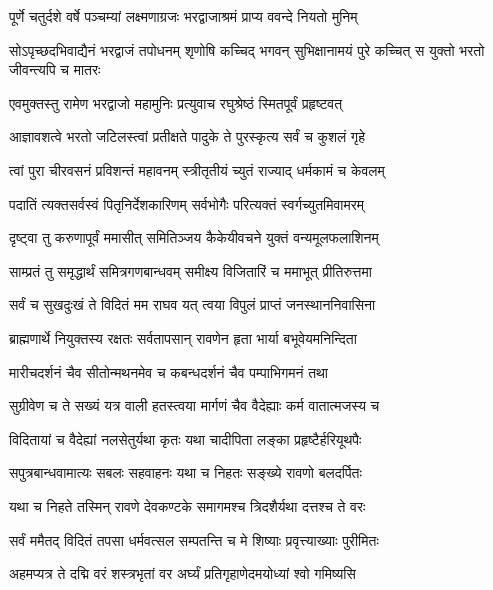 
\twolineshloka
{पूर्णे चतुर्दशे वर्षे पञ्चम्यां लक्ष्मणाग्रजः}
{भरद्वाजाश्रमं प्राप्य ववन्दे नियतो मुनिम्} %

\threelineshloka
{सोऽपृच्छदभिवाद्यैनं भरद्वाजं तपोधनम्}
{शृणोषि कच्चिद् भगवन् सुभिक्षानामयं पुरे}
{कच्चित् स युक्तो भरतो जीवन्त्यपि च मातरः} %

\twolineshloka
{एवमुक्तस्तु रामेण भरद्वाजो महामुनिः}
{प्रत्युवाच रघुश्रेष्ठं स्मितपूर्वं प्रहृष्टवत्} %

\twolineshloka
{आज्ञावशत्वे भरतो जटिलस्त्वां प्रतीक्षते}
{पादुके ते पुरस्कृत्य सर्वं च कुशलं गृहे} %

\twolineshloka
{त्वां पुरा चीरवसनं प्रविशन्तं महावनम्}
{स्त्रीतृतीयं च्युतं राज्याद् धर्मकामं च केवलम्} %

\twolineshloka
{पदातिं त्यक्तसर्वस्वं पितृनिर्देशकारिणम्}
{सर्वभोगैः परित्यक्तं स्वर्गच्युतमिवामरम्} %

\twolineshloka
{दृष्ट्वा तु करुणापूर्वं ममासीत् समितिञ्जय}
{कैकेयीवचने युक्तं वन्यमूलफलाशिनम्} %

\twolineshloka
{साम्प्रतं तु समृद्धार्थं समित्रगणबान्धवम्}
{समीक्ष्य विजितारिं च ममाभूत् प्रीतिरुत्तमा} %

\twolineshloka
{सर्वं च सुखदुःखं ते विदितं मम राघव}
{यत् त्वया विपुलं प्राप्तं जनस्थाननिवासिना} %

\twolineshloka
{ब्राह्मणार्थे नियुक्तस्य रक्षतः सर्वतापसान्}
{रावणेन हृता भार्या बभूवेयमनिन्दिता} %

\twolineshloka
{मारीचदर्शनं चैव सीतोन्मथनमेव च}
{कबन्धदर्शनं चैव पम्पाभिगमनं तथा} %

\twolineshloka
{सुग्रीवेण च ते सख्यं यत्र वाली हतस्त्वया}
{मार्गणं चैव वैदेह्याः कर्म वातात्मजस्य च} %

\twolineshloka
{विदितायां च वैदेह्यां नलसेतुर्यथा कृतः}
{यथा चादीपिता लङ्का प्रहृष्टैर्हरियूथपैः} %

\twolineshloka
{सपुत्रबान्धवामात्यः सबलः सहवाहनः}
{यथा च निहतः सङ्ख्ये रावणो बलदर्पितः} %

\twolineshloka
{यथा च निहते तस्मिन् रावणे देवकण्टके}
{समागमश्च त्रिदशैर्यथा दत्तश्च ते वरः} %

\twolineshloka
{सर्वं ममैतद् विदितं तपसा धर्मवत्सल}
{सम्पतन्ति च मे शिष्याः प्रवृत्त्याख्याः पुरीमितः} %

\twolineshloka
{अहमप्यत्र ते दद्मि वरं शस्त्रभृतां वर}
{अर्घ्यं प्रतिगृहाणेदमयोध्यां श्वो गमिष्यसि} %

